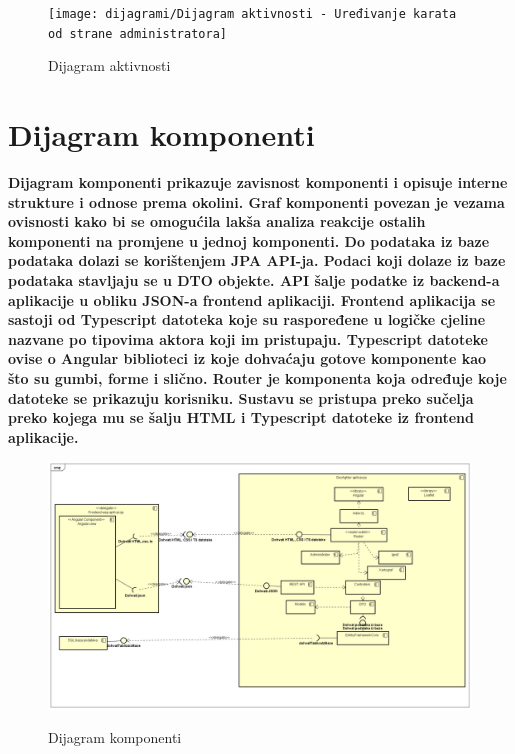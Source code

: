 			\begin{figure}[H]
				\centering
				\texttt{[image: dijagrami/Dijagram aktivnosti - Uređivanje karata od strane administratora]} \\
				\caption{Dijagram aktivnosti}
				\label{fig:UC8_sekvencijski}
			\end{figure}
			
			\eject
		\section{Dijagram komponenti}
		
			\textbf{\textnormal{Dijagram komponenti prikazuje zavisnost komponenti i opisuje interne strukture i odnose prema okolini. Graf komponenti povezan je vezama ovisnosti kako bi se omogućila lakša analiza reakcije ostalih komponenti na promjene u jednoj komponenti. Do podataka iz baze podataka dolazi se korištenjem JPA API-ja. Podaci koji dolaze iz baze podataka stavljaju se u DTO objekte. API šalje podatke iz backend-a aplikacije u obliku JSON-a frontend aplikaciji. Frontend aplikacija se sastoji od Typescript datoteka koje su raspoređene u logičke cjeline nazvane po tipovima aktora koji im pristupaju. Typescript datoteke ovise o Angular biblioteci iz koje dohvaćaju gotove komponente kao što su gumbi, forme i slično. Router je komponenta koja određuje koje datoteke se prikazuju korisniku. Sustavu se pristupa preko sučelja preko kojega mu se šalju HTML i Typescript datoteke iz frontend aplikacije.}}\\
			
			\begin{figure}[H]
				\centering
				\includegraphics[scale=0.32]{dijagrami/ComponentDiagramGeoF} \\
				\caption{Dijagram komponenti}
				\label{fig:UC8_sekvencijski}
			\end{figure}
			
		